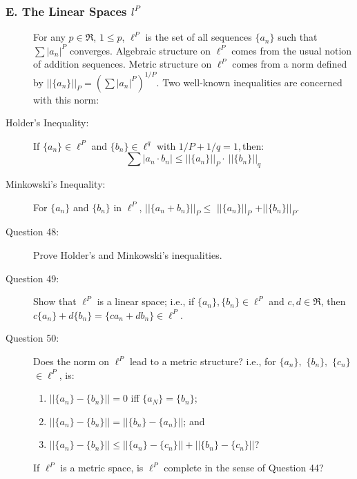 \documentclass{article}
\begin{document}
\subsubsection*{E. The Linear Spaces $l^P$}

\begin{description}

  \item[] For any $p \in \Re$, $1 \leq p$, $\ell^P$ is the set of all sequences $\{ a_n \}$ such that $\sum |a_n|^P$ converges. Algebraic structure on $\ell^P$ comes from the usual notion of addition sequences. Metric structure on $\ell^P$ comes from a norm defined by $|| \{ a_n \} ||_P = (\sum |a_n|^P)^{1/P}$. Two well-known inequalities are concerned with this norm:

  \item[Holder's Inequality:] If $\{a_n\} \in \ell^P$ and $\{b_n\} \in \ell^q$ with $1/P + 1/q = 1, $then:
    \begin{equation*}
    \sum |a_n \cdot b_n| \leq ||\{a_n\}||_P \cdot\ ||\{b_n\}||_q
    \end{equation*}

  \item[Minkowski's Inequality:] For $\{ a_n \}$ and $\{ b_n \}$ in $\ell^P$, $||\{a_n + b_n\}||_P \leq$ $||\{a_n\}||_P$ $+ ||\{b_n\}||_P$.

  \item[Question 48:] Prove Holder's and Minkowski's inequalities.

  \item[Question 49:] Show that $\ell^P$ is a linear space; i.e., if $\{ a_n \} , \{ b_n \} \in \ell^P$ and $c,d \in \Re$, then $c \{ a_n \} + d \{ b_n \} = \{ c a_n + d b_n \} \in \ell^P$.

  \item[Question 50:] Does the norm on $\ell^P$ lead to a metric structure? i.e., for $\{ a_n \},$ $\{ b_n \},$ $\{ c_n \}$ $\in \ell^P$, is: 
    \begin{enumerate}[\hspace{1cm}(1)]
      \item $||\{a_n\} - \{b_n\}|| = 0$ iff $\{ a_N \} = \{ b_n \}$;
      \item $||\{a_n\} - \{b_n\}|| = ||\{b_n\} - \{a_n\}||$; and
      \item $||\{a_n\} - \{b_n\}|| \leq ||\{a_n\} - \{c_n\}|| + ||\{b_n\} - \{c_n\}||$?
    \end{enumerate}
    If $\ell^P$ is a metric space, is $\ell^P$ complete in the sense of Question 44?

\end{description}
\end{document}

